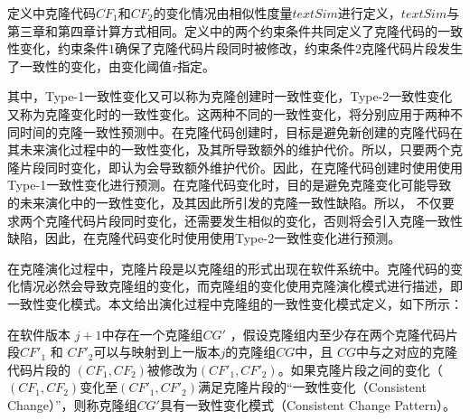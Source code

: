 
定义中克隆代码$ CF_1 $和$ CF_2 $的变化情况由相似性度量$ \mathit {textSim} $进行定义，$textSim$与第三章和第四章计算方式相同。定义中的两个约束条件共同定义了克隆代码的一致性变化，约束条件$1$确保了克隆代码片段同时被修改，约束条件$2$克隆代码片段发生了一致性的变化，由变化阈值$\tau$指定。

其中，Type-1一致性变化又可以称为克隆创建时一致性变化，Type-2一致性变化又称为克隆变化时的一致性变化。这两种不同的一致性变化，将分别应用于两种不同时间的克隆一致性预测中。在克隆代码创建时，目标是避免新创建的克隆代码在其未来演化过程中的一致性变化，及其所导致额外的维护代价。所以，只要两个克隆片段同时变化，即认为会导致额外维护代价。因此，在克隆代码创建时使用使用Type-1一致性变化进行预测。在克隆代码变化时，目的是避免克隆变化可能导致的未来演化中的一致性变化，及其因此所引发的克隆一致性缺陷。所以， 不仅要求两个克隆代码片段同时变化，还需要发生相似的变化，否则将会引入克隆一致性缺陷，因此，在克隆代码变化时使用使用Type-2一致性变化进行预测。

在克隆演化过程中，克隆片段是以克隆组的形式出现在软件系统中。克隆代码的变化情况必然会导致克隆组的变化，而克隆组的变化使用克隆演化模式进行描述，即一致性变化模式。本文给出演化过程中克隆组的一致性变化模式定义，如下所示：\\


\begin{definition}
\label{def-pattern}
在软件版本 $j+1$中存在一个克隆组$CG'$ ，假设克隆组内至少存在两个克隆代码片段$CF'_1$ 和 $CF'_2$可以与映射到上一版本$j$的克隆组$CG$中，且 $CG$中与之对应的克隆代码片段的 $(CF_1,CF_2)$被修改为$(CF'_1,CF'_2)$。如果克隆片段之间的变化（ $(CF_1,CF_2)$变化至$(CF'_1,CF'_2)$满足克隆片段的“一致性变化（Consistent Change）”，则称克隆组$CG'$具有一致性变化模式（Consistent Change Pattern）。
\end{definition}


